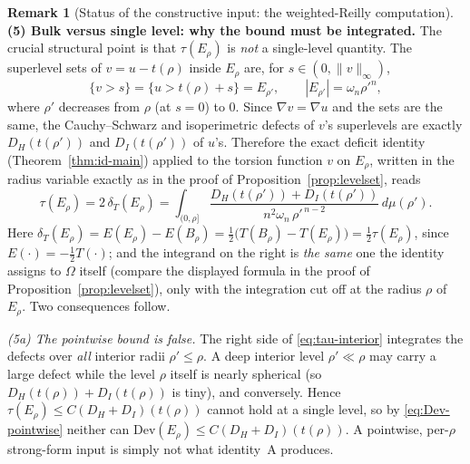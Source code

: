 \documentclass[11pt]{amsart}
\theoremstyle{definition}
\newtheorem{remark}[theorem]{Remark}
\newcommand{\Om}{\Omega}
\begin{document}
\begin{remark}[Status of the constructive input: the weighted-Reilly computation]
\medskip
\noindent\textbf{(5) Bulk versus single level: why the bound must be integrated.}
The crucial structural point is that \(\tau(E_\rho)\) is \emph{not} a single-level
quantity.  The superlevel sets of \(v=u-t(\rho)\) inside \(E_\rho\) are, for
\(s\in(0,\|v\|_\infty)\),
\[
   \{v>s\}=\{u>t(\rho)+s\}=E_{\rho'},
   \qquad |E_{\rho'}|=\omega_n\rho'^n,
\]
where \(\rho'\) decreases from \(\rho\) (at \(s=0\)) to \(0\).  Since
\(\nabla v=\nabla u\) and the sets are the same, the Cauchy--Schwarz and
isoperimetric defects of \(v\)'s superlevels are exactly \(D_H(t(\rho'))\) and
\(D_I(t(\rho'))\) of \(u\)'s.  Therefore the exact deficit identity
(Theorem~\ref{thm:id-main}) applied to the torsion function \(v\) on \(E_\rho\),
written in the radius variable exactly as in the proof of
Proposition~\ref{prop:levelset}, reads
\begin{equation}\label{eq:tau-interior}
   \tau(E_\rho)=2\,\delta_T(E_\rho)
   =\int_{(0,\rho]}
     \frac{D_H(t(\rho'))+D_I(t(\rho'))}{n^2\omega_n\,\rho'^{\,n-2}}\,d\mu(\rho').
\end{equation}
Here \(\delta_T(E_\rho)=E(E_\rho)-E(B_\rho)=\tfrac12\bigl(T(B_\rho)-T(E_\rho)\bigr)
=\tfrac12\tau(E_\rho)\), since \(E(\cdot)=-\tfrac12T(\cdot)\); and the integrand on
the right is \emph{the same} one the identity assigns to \(\Om\) itself
(compare the displayed formula in the proof of
Proposition~\ref{prop:levelset}), only with the integration cut off at the radius
\(\rho\) of \(E_\rho\).  Two consequences follow.

\emph{(5a) The pointwise bound is false.}  The right side of
\eqref{eq:tau-interior} integrates the defects over \emph{all} interior radii
\(\rho'\le\rho\).  A deep interior level \(\rho'\ll\rho\) may carry a large defect
while the level \(\rho\) itself is nearly spherical (so
\(D_H(t(\rho))+D_I(t(\rho))\) is tiny), and conversely.  Hence
\(\tau(E_\rho)\le C(D_H+D_I)(t(\rho))\) cannot hold at a single level, so by
\eqref{eq:Dev-pointwise} neither can \(\mathrm{Dev}(E_\rho)\le
C(D_H+D_I)(t(\rho))\).  A pointwise, per-\(\rho\) strong-form input is simply not
what identity~A produces.


\end{remark}
\end{document}
